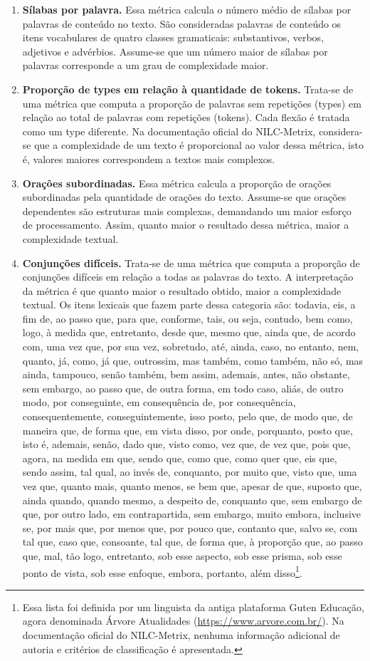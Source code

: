 \documentclass[portuguese]{textolivre}
\begin{document}
\begin{enumerate}[label=\Roman*.]
    \item \textbf{Sílabas por palavra.} Essa métrica calcula o número médio de sílabas por palavras de conteúdo no texto.
São consideradas palavras de conteúdo os itens vocabulares de quatro classes gramaticais: substantivos, verbos, adjetivos e advérbios. Assume-se que um número maior de sílabas por palavras corresponde a um grau de complexidade maior.
    \item \textbf{Proporção de types em relação à quantidade de tokens.} Trata-se de uma métrica que computa a proporção de palavras sem repetições (types) em relação ao total de palavras com repetições (tokens). Cada flexão é tratada como um type diferente. Na documentação oficial do NILC-Metrix, considera-se que a complexidade de um texto é proporcional ao valor dessa métrica, isto é, valores maiores correspondem a textos mais complexos.
    \item \textbf{Orações subordinadas.} Essa métrica calcula a proporção de orações subordinadas pela quantidade de orações do texto. Assume-se que orações dependentes são estruturas mais complexas, demandando um maior esforço de processamento. Assim, quanto maior o resultado dessa métrica, maior a complexidade textual.
    \item \textbf{Conjunções difíceis.} Trata-se de uma métrica que computa a proporção de conjunções difíceis em relação a todas as palavras do texto. A interpretação da métrica é que quanto maior o resultado obtido, maior a complexidade textual. Os itens lexicais que fazem parte dessa categoria são:
    todavia, eis, a fim de, ao passo que, para que, conforme, tais, ou seja, contudo, bem como, logo, à medida que, entretanto, desde que, mesmo que, ainda que, de acordo com, uma vez que, por sua vez, sobretudo, até, ainda, caso, no entanto, nem, quanto, já, como, já que, outrossim, mas também, como também, não só, mas ainda, tampouco, senão também, bem assim, ademais, antes, não obstante, sem embargo, ao passo que, de outra forma, em todo caso, aliás, de outro modo, por conseguinte, em consequência de, por consequência, consequentemente, conseguintemente, isso posto, pelo que, de modo que, de maneira que, de forma que, em vista disso, por onde, porquanto, posto que, isto é, ademais, senão, dado que, visto como, vez que, de vez que, pois que, agora, na medida em que, sendo que, como que, como quer que, eis que, sendo assim, tal qual, ao invés de, conquanto, por muito que, visto que, uma vez que, quanto mais, quanto menos, se bem que, apesar de que, suposto que, ainda quando, quando mesmo, a despeito de, conquanto que, sem embargo de que, por outro lado, em contrapartida, sem embargo, muito embora, inclusive se, por mais que, por menos que, por pouco que, contanto que, salvo se, com tal que, caso que, consoante, tal que, de forma que, à proporção que, ao passo que, mal, tão logo, entretanto, sob esse aspecto, sob esse prisma, sob esse ponto de vista, sob esse enfoque, embora, portanto, além disso\footnote{Essa lista foi definida por um linguista da antiga plataforma Guten Educação, agora denominada Árvore Atualidades (\url{https://www.arvore.com.br/}). Na documentação oficial do NILC-Metrix, nenhuma informação adicional de autoria e critérios de classificação é apresentada.}.

\end{enumerate}
\end{document}
